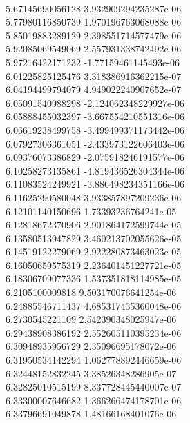 { \\
5.67145690056128 3.932909294235287e-06
 \\
5.77980116850739 1.970196763068088e-06
 \\
5.85019883289129 2.398551714577479e-06
 \\
5.92085069549069 2.557931338742492e-06
 \\
5.97216422171232 -1.77159461145493e-06
 \\
6.01225825125476 3.318386916362215e-07
 \\
6.04194499794079 4.949022240907652e-07
 \\
6.05091540988298 -2.124062348229927e-06
 \\
6.05888455032397 -3.667554210551316e-06
 \\
6.06619238499758 -3.499499371173442e-06
 \\
6.07927306361051 -2.433973122606403e-06
 \\
6.09376073386829 -2.075918246191577e-06
 \\
6.10258273135861 -4.819436526304344e-06
 \\
6.11083524249921 -3.886498234351166e-06
 \\
6.11625290580048 3.933857897209236e-06
 \\
6.12101140150696 1.73393236764241e-05
 \\
6.12818672370906 2.901864172599744e-05
 \\
6.13580513947829 3.460213702055626e-05
 \\
6.14519122279069 2.922280873463023e-05
 \\
6.16050659575319 2.236401451227721e-05
 \\
6.18306709077336 1.537351818114985e-05
 \\
6.2105100009818 9.503170076641254e-06
 \\
6.24885546711437 4.685317435360048e-06
 \\
6.2730545221109 2.542390348025947e-06
 \\
6.29438908386192 2.552605110395234e-06
 \\
6.30948935956729 2.35096695178072e-06
 \\
6.31950534142294 1.062778892446659e-06
 \\
6.32448152832245 3.38526348286905e-07
 \\
6.32825010515199 8.337728445440007e-07
 \\
6.33300007646682 1.366266474178701e-06
 \\
6.33796691049878 1.48166168401076e-06
 \\
}
